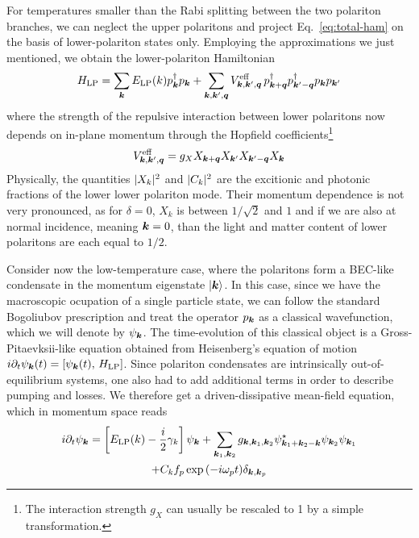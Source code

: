 For temperatures smaller than the Rabi splitting between the two
polariton branches, we can neglect the upper polaritons and project
Eq.~\eqref{eq:total-ham} on the basis of lower-polariton states
only. Employing the approximations we just mentioned, we obtain the
lower-polariton Hamiltonian
%
\begin{equation}\label{eq:LP-ham}
  H_{\text{LP}} = \sum_{\bm{k}} E_{\text{LP}}(k) p_{\bm{k}}^{\dagger} p_{\bm{k}} + \sum_{\bm{k},\bm{k}^{\prime},\bm{q}} V^{\text{eff}}_{\bm{k},\bm{k}^{\prime},\bm{q}}\, p^{\dagger}_{\bm{k} + \bm{q}} p^{\dagger}_{\bm{k}^{\prime} - \bm{q}} p_{\bm{k}} p_{\bm{k}^{\prime}}
\end{equation}
% 
where the strength of the repulsive interaction between lower
polaritons now depends on in-plane momentum through the Hopfield
coefficients\footnote{The interaction strength $g_X$ can usually be
  rescaled to 1 by a simple transformation.}
%
\begin{equation}\label{eq:g-eff}
  V^{\text{eff}}_{\bm{k},\bm{k}^{\prime},\bm{q}} = g_X X_{\bm{k} + \bm{q}}X_{\bm{k}^{\prime}}X_{\bm{k}^{\prime} - \bm{q}}X_{\bm{k}}
\end{equation}
% 
Physically, the quantities $\vert X_k \vert^2$ and $\vert C_k \vert^2$ are the
excitionic and photonic fractions of the lower lower polariton
mode. Their momentum dependence is not very pronounced, as for
$\delta = 0$, $X_k$ is between $1/\sqrt{2}$ and $1$ and if we are also
at normal incidence, meaning $\bm{k} = 0$, than the light and matter
content of lower polaritons are each equal to $1/2$.

Consider now the low-temperature case, where the polaritons form a
BEC-like condensate in the momentum eigenstate $\vert \bm{k} \rangle$. In this
case, since we have the macroscopic ocupation of a single particle
state, we can follow the standard Bogoliubov prescription and treat
the operator $p_{\bm{k}}$ as a classical wavefunction, which we will
denote by $\psi_{\bm{k}}$. The time-evolution of this classical object is
a Gross-Pitaevksii-like equation obtained from Heisenberg's equation
of motion
$i \partial_t \psi_{\bm{k}}(t) = \left[\psi_{\bm{k}}(t),\, H_{\text{LP}}\right]$.
Since polariton condensates are intrinsically out-of-equilibrium
systems, one also had to add additional terms in order to describe
pumping and losses. We therefore get a driven-dissipative mean-field
equation, which in momentum space reads
%
\begin{multline}\label{eq:mom-GPE}
  i\partial_t\psi_{\bm{k}} = \left[E_{\text{LP}}(k) - \frac{i}{2} \gamma_k\right]\psi_{\bm{k}} + \sum_{\bm{k}_1,\bm{k}_2} g_{\bm{k},\bm{k}_1,\bm{k}_2} \psi^{\star}_{\bm{k}_1 + \bm{k}_2 - \bm{k}} \psi_{\bm{k}_2} \psi_{\bm{k}_1}\\
  + C_k f_p \exp{\left(-i \omega_pt\right)} \delta_{\bm{k},\bm{k}_{p}}
\end{multline}
% 

